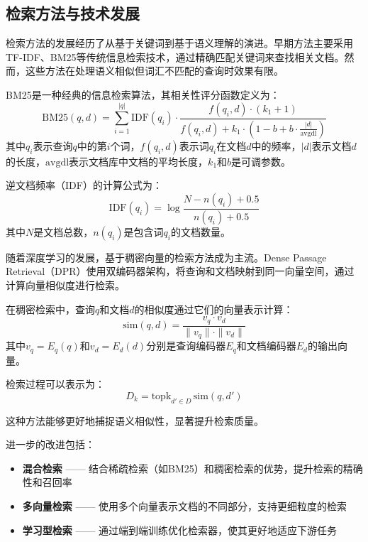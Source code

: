 \subsection{检索方法与技术发展}

检索方法的发展经历了从基于关键词到基于语义理解的演进。早期方法主要采用TF-IDF、BM25等传统信息检索技术，通过精确匹配关键词来查找相关文档。然而，这些方法在处理语义相似但词汇不匹配的查询时效果有限。

BM25是一种经典的信息检索算法，其相关性评分函数定义为：
\begin{equation}
\mathrm{BM25}(q, d) = \sum_{i=1}^{|q|} \mathrm{IDF}(q_i) \cdot \frac{f(q_i, d) \cdot (k_1 + 1)}{f(q_i, d) + k_1 \cdot (1 - b + b \cdot \frac{|d|}{\mathrm{avgdl}})}
\end{equation}
其中$q_i$表示查询$q$中的第$i$个词，$f(q_i, d)$表示词$q_i$在文档$d$中的频率，$|d|$表示文档$d$的长度，$\mathrm{avgdl}$表示文档库中文档的平均长度，$k_1$和$b$是可调参数。

逆文档频率（IDF）的计算公式为：
\begin{equation}
\mathrm{IDF}(q_i) = \log\frac{N - n(q_i) + 0.5}{n(q_i) + 0.5}
\end{equation}
其中$N$是文档总数，$n(q_i)$是包含词$q_i$的文档数量。

随着深度学习的发展，基于稠密向量的检索方法成为主流。Dense Passage Retrieval（DPR）使用双编码器架构，将查询和文档映射到同一向量空间，通过计算向量相似度进行检索\supercite{DBLP:conf/emnlp/KarpukhinOMLWEC20}。

在稠密检索中，查询$q$和文档$d$的相似度通过它们的向量表示计算：
\begin{equation}
\mathrm{sim}(q, d) = \frac{v_q \cdot v_d}{\|v_q\| \cdot \|v_d\|}
\end{equation}
其中$v_q = E_q(q)$和$v_d = E_d(d)$分别是查询编码器$E_q$和文档编码器$E_d$的输出向量。

检索过程可以表示为：
\begin{equation}
D_k = \mathrm{topk}_{d' \in D} \, \mathrm{sim}(q, d')
\end{equation}

这种方法能够更好地捕捉语义相似性，显著提升检索质量。

进一步的改进包括：
\begin{itemize}
    \item \textbf{混合检索} —— 结合稀疏检索（如BM25）和稠密检索的优势，提升检索的精确性和召回率
    \item \textbf{多向量检索} —— 使用多个向量表示文档的不同部分，支持更细粒度的检索
    \item \textbf{学习型检索} —— 通过端到端训练优化检索器，使其更好地适应下游任务
\end{itemize}

